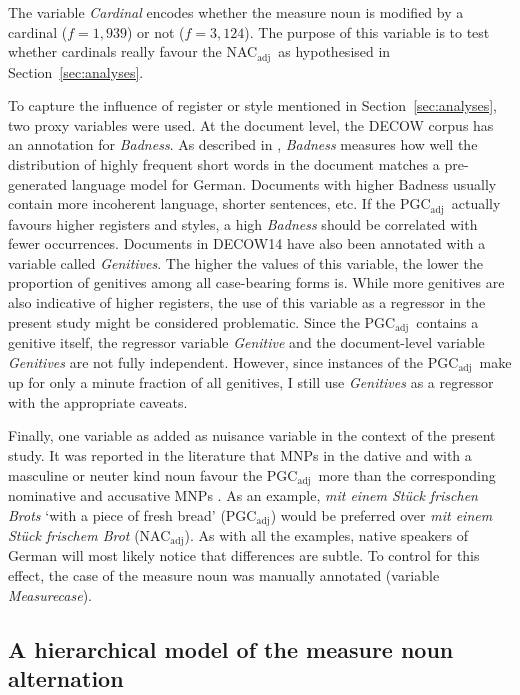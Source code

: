 \documentclass[USenglish]{article}
\newcommand{\Sub}[1]{\ensuremath{\mathrm{_{#1}}}}
\newcommand{\NACa}{NAC\Sub{adj}}
\newcommand{\PGCa}{PGC\Sub{adj}}
\begin{document}
The variable \textit{Cardinal} encodes whether the measure noun is modified by a cardinal ($f=1,939$) or not ($f=3,124$).
The purpose of this variable is to test whether cardinals really favour the \NACa\ as hypothesised in Section~\ref{sec:analyses}.

To capture the influence of register or style mentioned in Section~\ref{sec:analyses}, two proxy variables were used.
At the document level, the DECOW corpus has an annotation for \textit{Badness}.
As described in \cite{SchaeferEa2013}, \textit{Badness} measures how well the distribution of highly frequent short words in the document matches a pre-generated language model for German.
Documents with higher Badness usually contain more incoherent language, shorter sentences, etc.
If the \PGCa\ actually favours higher registers and styles, a high \textit{Badness} should be correlated with fewer occurrences.
Documents in DECOW14 have also been annotated with a variable called \textit{Genitives}.
The higher the values of this variable, the lower the proportion of genitives among all case-bearing forms is.
While more genitives are also indicative of higher registers, the use of this variable as a regressor in the present study might be considered problematic.
Since the \PGCa\ contains a genitive itself, the regressor variable \textit{Genitive} and the document-level variable \textit{Genitives} are not fully independent.
However, since instances of the \PGCa\ make up for only a minute fraction of all genitives, I still use \textit{Genitives} as a regressor with the appropriate caveats.

Finally, one variable as added as nuisance variable in the context of the present study.
It was reported in the literature that MNPs in the dative and with a masculine or neuter kind noun favour the \PGCa\ more than the corresponding nominative and accusative MNPs \citep{Hentschel1993,Zimmer2015}.
As an example, \textit{mit einem Stück frischen Brots} `with a piece of fresh bread' (\PGCa) would be preferred over \textit{mit einem Stück frischem Brot} (\NACa).
As with all the examples, native speakers of German will most likely notice that differences are subtle.
To control for this effect, the case of the measure noun was manually annotated (variable \textit{Measurecase}).




\subsection{A hierarchical model of the measure noun alternation}
\label{sec:corpushierarchicalmodel}
\end{document}
